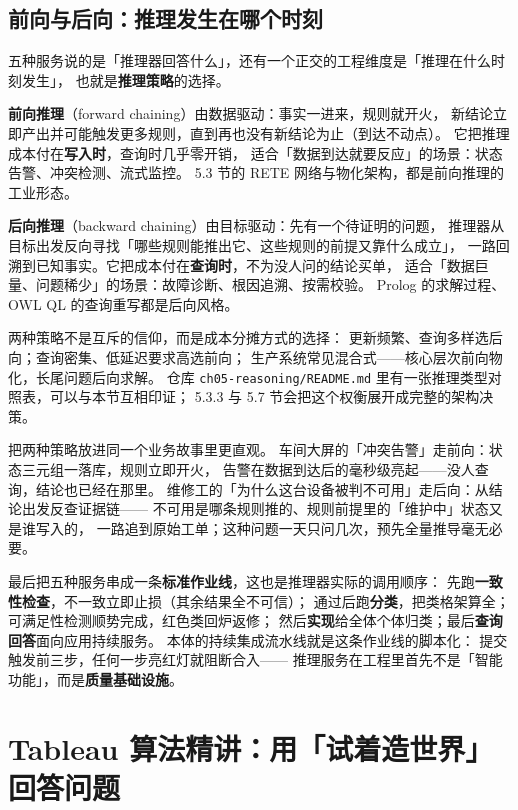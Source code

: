 \subsection{前向与后向：推理发生在哪个时刻}

五种服务说的是「推理器回答什么」，还有一个正交的工程维度是「推理在什么时刻发生」，
也就是\textbf{推理策略}的选择。

\textbf{前向推理}（forward chaining）由数据驱动：事实一进来，规则就开火，
新结论立即产出并可能触发更多规则，直到再也没有新结论为止（到达不动点）。
它把推理成本付在\textbf{写入时}，查询时几乎零开销，
适合「数据到达就要反应」的场景：状态告警、冲突检测、流式监控。
5.3 节的 RETE 网络与物化架构，都是前向推理的工业形态。

\textbf{后向推理}（backward chaining）由目标驱动：先有一个待证明的问题，
推理器从目标出发反向寻找「哪些规则能推出它、这些规则的前提又靠什么成立」，
一路回溯到已知事实。它把成本付在\textbf{查询时}，不为没人问的结论买单，
适合「数据巨量、问题稀少」的场景：故障诊断、根因追溯、按需校验。
Prolog 的求解过程、OWL QL 的查询重写都是后向风格。

两种策略不是互斥的信仰，而是成本分摊方式的选择：
更新频繁、查询多样选后向；查询密集、低延迟要求高选前向；
生产系统常见混合式——核心层次前向物化，长尾问题后向求解。
仓库 \texttt{ch05-reasoning/README.md} 里有一张推理类型对照表，可以与本节互相印证；
5.3.3 与 5.7 节会把这个权衡展开成完整的架构决策。

把两种策略放进同一个业务故事里更直观。
车间大屏的「冲突告警」走前向：状态三元组一落库，规则立即开火，
告警在数据到达后的毫秒级亮起——没人查询，结论也已经在那里。
维修工的「为什么这台设备被判不可用」走后向：从结论出发反查证据链——
不可用是哪条规则推的、规则前提里的「维护中」状态又是谁写入的，
一路追到原始工单；这种问题一天只问几次，预先全量推导毫无必要。

最后把五种服务串成一条\textbf{标准作业线}，这也是推理器实际的调用顺序：
先跑\textbf{一致性检查}，不一致立即止损（其余结果全不可信）；
通过后跑\textbf{分类}，把类格架算全；可满足性检测顺势完成，红色类回炉返修；
然后\textbf{实现}给全体个体归类；最后\textbf{查询回答}面向应用持续服务。
本体的持续集成流水线就是这条作业线的脚本化：
提交触发前三步，任何一步亮红灯就阻断合入——
推理服务在工程里首先不是「智能功能」，而是\textbf{质量基础设施}。

\section{Tableau 算法精讲：用「试着造世界」回答问题}

